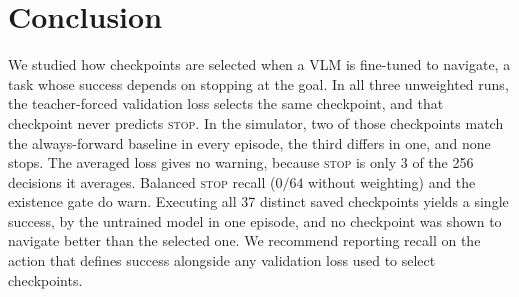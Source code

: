 \section{Conclusion}

We studied how checkpoints are selected when a VLM is fine-tuned to navigate, a task whose success
depends on stopping at the goal. In all three unweighted runs, the teacher-forced validation loss
selects the same checkpoint, and that checkpoint never predicts \textsc{stop}. In the simulator,
two of those checkpoints match the always-forward baseline in every episode, the third differs in
one, and none stops. The averaged loss gives no warning, because \textsc{stop} is only 3 of the 256
decisions it averages. Balanced \textsc{stop} recall ($0/64$ without weighting) and the existence
gate do warn. Executing all 37 distinct saved checkpoints yields a single success, by the untrained
model in one episode, and no checkpoint was shown to navigate better than the selected one. We
recommend reporting recall on the action that defines success alongside any validation loss used
to select checkpoints.
